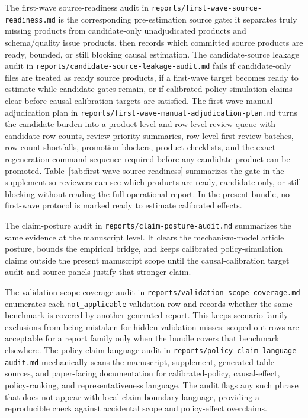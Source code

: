 The first-wave source-readiness audit in \texttt{reports/first-wave-source-readiness.md} is the corresponding pre-estimation source gate: it separates truly missing products from candidate-only unadjudicated products and schema/quality issue products, then records which committed source products are ready, bounded, or still blocking causal estimation. The candidate-source leakage audit in \texttt{reports/candidate-source-leakage-audit.md} fails if candidate-only files are treated as ready source products, if a first-wave target becomes ready to estimate while candidate gates remain, or if calibrated policy-simulation claims clear before causal-calibration targets are satisfied. The first-wave manual adjudication plan in \texttt{reports/first-wave-manual-adjudication-plan.md} turns the candidate burden into a product-level and row-level review queue with candidate-row counts, review-priority summaries, row-level first-review batches, row-count shortfalls, promotion blockers, product checklists, and the exact regeneration command sequence required before any candidate product can be promoted. Table~\ref{tab:first-wave-source-readiness} summarizes the gate in the supplement so reviewers can see which products are ready, candidate-only, or still blocking without reading the full operational report. In the present bundle, no first-wave protocol is marked ready to estimate calibrated effects.



The claim-posture audit in \texttt{reports/claim-posture-audit.md} summarizes the same evidence at the manuscript level. It clears the mechanism-model article posture, bounds the empirical bridge, and keeps calibrated policy-simulation claims outside the present manuscript scope until the causal-calibration target audit and source panels justify that stronger claim.

The validation-scope coverage audit in \texttt{reports/validation-scope-coverage.md} enumerates each \texttt{not\_applicable} validation row and records whether the same benchmark is covered by another generated report. This keeps scenario-family exclusions from being mistaken for hidden validation misses: scoped-out rows are acceptable for a report family only when the bundle covers that benchmark elsewhere. The policy-claim language audit in \texttt{reports/policy-claim-language-audit.md} mechanically scans the manuscript, supplement, generated-table sources, and paper-facing documentation for calibrated-policy, causal-effect, policy-ranking, and representativeness language. The audit flags any such phrase that does not appear with local claim-boundary language, providing a reproducible check against accidental scope and policy-effect overclaims.

